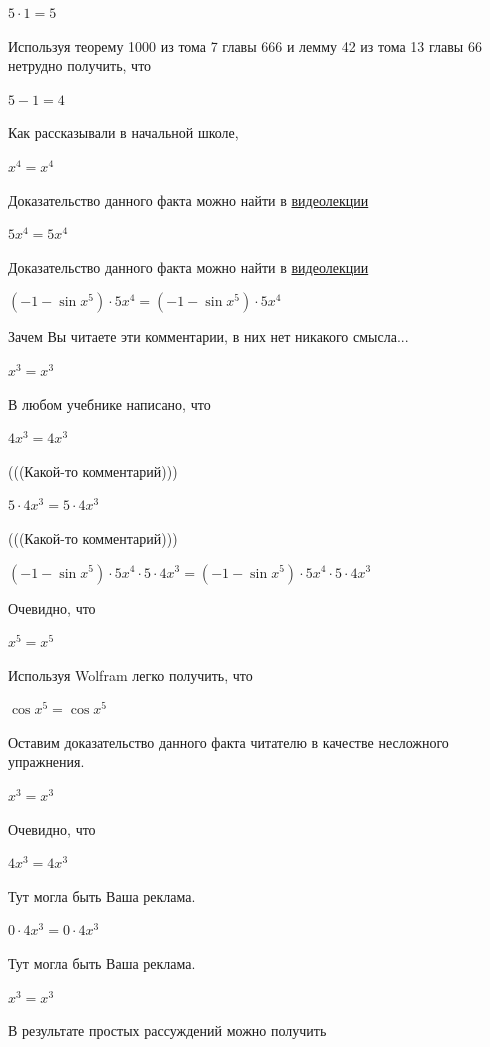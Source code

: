 \documentclass[12pt,a4paper,fleqn]{article}
\theoremstyle{definition}
\begin{document}
$ 5  \cdot  1  =  5 $

Используя теорему 1000 из тома 7 главы 666 и лемму 42 из тома 13 главы 66 нетрудно получить, что 

$ 5  -  1  =  4 $

Как рассказывали в начальной школе, 

${ x }^{ 4 } = { x }^{ 4 }$

Доказательство данного факта можно найти в \href{https://www.youtube.com/watch?v=dQw4w9WgXcQ}{видеолекции} 

$ 5 { x }^{ 4 } =  5 { x }^{ 4 }$

Доказательство данного факта можно найти в \href{https://www.youtube.com/watch?v=dQw4w9WgXcQ}{видеолекции} 

$( -1  - \sin{ x }^{ 5 }) \cdot  5 { x }^{ 4 } = ( -1  - \sin{ x }^{ 5 }) \cdot  5 { x }^{ 4 }$

Зачем Вы читаете эти комментарии, в них нет никакого смысла... 

${ x }^{ 3 } = { x }^{ 3 }$

В любом учебнике написано, что 

$ 4 { x }^{ 3 } =  4 { x }^{ 3 }$

(((Какой-то комментарий))) 

$ 5  \cdot  4 { x }^{ 3 } =  5  \cdot  4 { x }^{ 3 }$

(((Какой-то комментарий))) 

$( -1  - \sin{ x }^{ 5 }) \cdot  5 { x }^{ 4 } \cdot  5  \cdot  4 { x }^{ 3 } = ( -1  - \sin{ x }^{ 5 }) \cdot  5 { x }^{ 4 } \cdot  5  \cdot  4 { x }^{ 3 }$

Очевидно, что 

${ x }^{ 5 } = { x }^{ 5 }$

Используя Wolfram легко получить, что 

$\cos{ x }^{ 5 } = \cos{ x }^{ 5 }$

Оставим доказательство данного факта читателю в качестве несложного упражнения. 

${ x }^{ 3 } = { x }^{ 3 }$

Очевидно, что 

$ 4 { x }^{ 3 } =  4 { x }^{ 3 }$

Тут могла быть Ваша реклама. 

$ 0  \cdot  4 { x }^{ 3 } =  0  \cdot  4 { x }^{ 3 }$

Тут могла быть Ваша реклама. 

${ x }^{ 3 } = { x }^{ 3 }$

В результате простых рассуждений можно получить 
\end{document}
